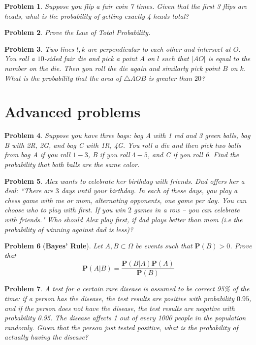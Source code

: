 \documentclass[a4paper,12pt]{article}
\theoremstyle{perfect}
\newtheorem{prb}{Problem}
\begin{document}
\begin{prb}
Suppose you flip a fair coin 7 times. Given that the first 3 flips are
heads, what is the probability of getting exactly 4 heads total?
\end{prb}

\begin{prb}
Prove the Law of Total Probability.
\end{prb}

\begin{prb}
Two lines $l, k$ are perpendicular to each other and intersect at $O$. You roll a $10$-sided fair die and pick a point $A$ on $l$ such that $|AO|$ is equal to the number on the die. Then you roll the die again and similarly pick point $B$ on $k$. What is the probability that the area of $\triangle AOB$ is greater than $20$? 
\end{prb}



\section{Advanced problems}

\begin{prb}
Suppose you have three bags: bag A with 1 red and 3 green balls, bag B with 2R, 2G, and bag C
with 1R, 4G. You roll a die and then pick two balls from bag A if you roll $1- 3$, B if you
roll $4-5$, and C if you roll 6. Find the probability that both balls are the same color.
\end{prb}

\begin{prb}
Alex wants to celebrate her birthday with friends. Dad offers her a deal: ``There are $3$ days until your birthday. In each of these days, you play a chess game with me or mom, alternating opponents, one game per day. You can choose who to play with first. If you win $2$ games in a row -- you can celebrate with friends."
Who should Alex play first, if dad plays better than mom (i.e the probability of winning against dad is less)? 
\end{prb}

\begin{prb}[\textbf{Bayes' Rule}]
Let $A, B \subset \Omega$ be events such that $\mathbf{P}(B) > 0$. Prove that
\begin{equation}
\mathbf{P}(A | B) = \frac{ \mathbf{P}(B |A)\mathbf{P}(A)}{\mathbf{P}(B)}
\end{equation}
\end{prb}

\begin{prb}
A test for a certain rare disease is assumed to be correct 95\% of the time: if a person has the disease, the test results are positive with probability $0.95$, and if the person does not have the disease, the test results are negative with probability 0.95. The disease affects 1 out of every 1000 people in the population randomly. Given that the person just tested positive, what is the probability of actually having the disease? 
\end{prb}


 
\end{document}
